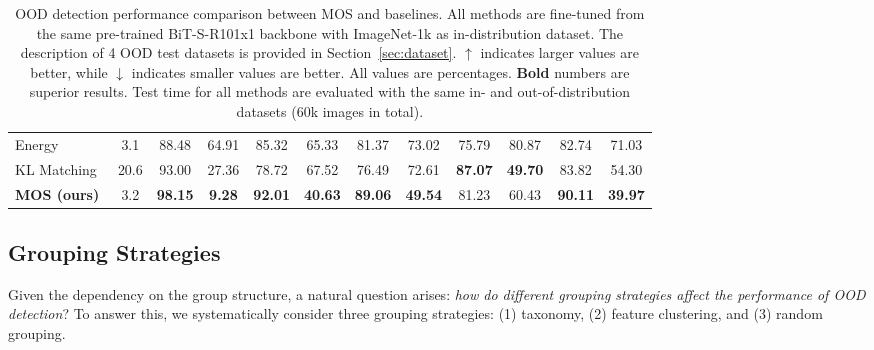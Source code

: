 \documentclass[final]{cvpr}
\begin{document}
\begin{table*}[ht]
{\begin{tabular}{l|c|cc|cc|cc|cc|cc}
Energy~\cite{liu2020energy}                           & 3.1                                                                                    & 88.48                & 64.91                 & 85.32                & 65.33                 & 81.37                & 73.02                 & 75.79                & 80.87                 & 82.74                & 71.03                \\
KL Matching~\cite{hendrycks2019benchmark}                      & 20.6                                                                                   & 93.00                & 27.36                 & 78.72                & 67.52                 & 76.49                & 72.61                 & \textbf{87.07}       & \textbf{49.70}        & 83.82                & 54.30                \\ \midrule
\textbf{MOS (ours)}                       & 3.2                                                                                    & \textbf{98.15}       & \textbf{9.28}         & \textbf{92.01}       & \textbf{40.63}        & \textbf{89.06}       & \textbf{49.54}        & 81.23                & 60.43                 & \textbf{90.11}       & \textbf{39.97}       \\ \bottomrule
\end{tabular}

}
\caption{\small{OOD detection performance comparison between MOS and baselines. All methods are fine-tuned from the same pre-trained BiT-S-R101x1 backbone with ImageNet-1k as in-distribution dataset. The description of 4 OOD test datasets is provided in Section~\ref{sec:dataset}. $\uparrow$ indicates larger values are better, while $\downarrow$ indicates smaller values are better. All values are percentages. \textbf{Bold} numbers are superior results. Test time for all methods are evaluated with the same in- and out-of-distribution datasets (60k images in total). }} \label{table:main_result}
\vspace{-0.3cm}
\end{table*}



\subsection{Grouping Strategies}
\label{sec:grouping}

Given the dependency on the group structure, a natural question arises: \emph{how do different grouping strategies affect the performance of OOD detection}? To answer this, we systematically consider three grouping strategies: (1) taxonomy, (2) feature clustering, and (3) random grouping. 
\end{document}

